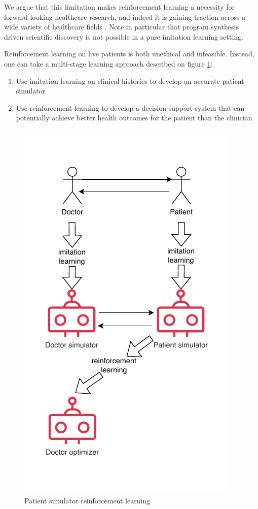 We argue that this limitation makes reinforcement learning a necessity for forward-looking healthcare research, and indeed it is gaining traction across a wide variety of healthcare fields \cite{yuReinforcementLearningHealthcare2021}.
Note in particular that program synthesis driven scientific discovery is not possible in a pure imitation learning setting.

Reinforcement learning on live patients is both unethical and infeasible.
Instead, one can take a multi-stage learning approach described on figure \ref{fig:RLCEPS}: 
\begin{enumerate}
  \item Use imitation learning on clinical histories to develop an accurate patient simulator
  \item Use reinforcement learning to develop a decision support system that can potentially achieve better health outcomes for the patient than the clinician
\end{enumerate}

\begin{figure}
  \centering
  \includegraphics[width=0.9\linewidth]{images/rlceps.pdf}
  \caption{Patient simulator reinforcement learning}
  \label{fig:RLCEPS}
\end{figure}

